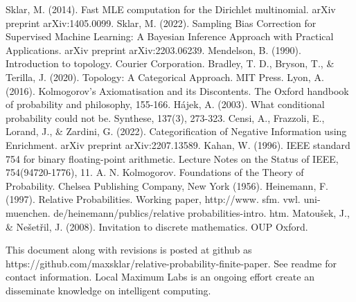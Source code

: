 \documentclass[twoside]{article}
\theoremstyle{plain}%
\theoremstyle{definition}
\theoremstyle{remark}
\begin{document}
\begin{thebibliography}{20}

Sklar, M. (2014). Fast MLE computation for the Dirichlet multinomial. arXiv preprint arXiv:1405.0099.
Sklar, M. (2022). Sampling Bias Correction for Supervised Machine Learning: A Bayesian Inference Approach with Practical Applications. arXiv preprint arXiv:2203.06239.
Mendelson, B. (1990). Introduction to topology. Courier Corporation.
Bradley, T. D., Bryson, T., \& Terilla, J. (2020). Topology: A Categorical Approach. MIT Press.
Lyon, A. (2016). Kolmogorov’s Axiomatisation and its Discontents. The Oxford handbook of probability and philosophy, 155-166.
Hájek, A. (2003). What conditional probability could not be. Synthese, 137(3), 273-323.
Censi, A., Frazzoli, E., Lorand, J., \& Zardini, G. (2022). Categorification of Negative Information using Enrichment. arXiv preprint arXiv:2207.13589.
Kahan, W. (1996). IEEE standard 754 for binary floating-point arithmetic. Lecture Notes on the Status of IEEE, 754(94720-1776), 11.
A. N. Kolmogorov. Foundations of the Theory of Probability. Chelsea Publishing Company, New York
(1956). 
Heinemann, F. (1997). Relative Probabilities. Working paper, http://www. sfm. vwl. uni-muenchen. de/heinemann/publics/relative probabilities-intro. htm.
Matoušek, J., \& Nešetřil, J. (2008). Invitation to discrete mathematics. OUP Oxford.

\end{thebibliography}

This document along with revisions is posted at github as https://github.com/maxsklar/relative-probability-finite-paper. See readme for contact information. Local Maximum Labs is an ongoing effort create an disseminate knowledge on intelligent computing.
\end{document}
